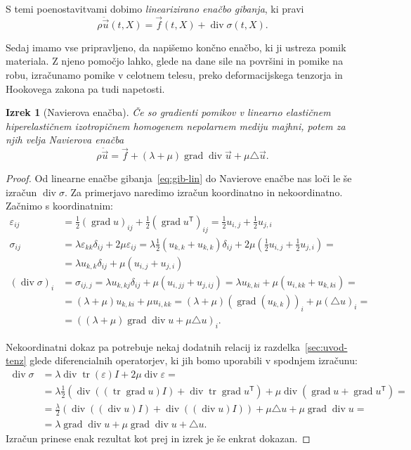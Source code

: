 \documentclass[12pt,a4paper,twoside]{article}
\theoremstyle{definition} %
\theoremstyle{plain} %
\newtheorem{izrek}[definicija]{Izrek}
\numberwithin{equation}{section}
\newcommand{\T}{\mathsf{T}}
\newcommand{\lap}{\triangle}
\renewcommand{\div}{\operatorname{div}}
\newcommand{\grad}{\operatorname{grad}}
\newcommand{\eps}{\varepsilon}
\newcommand{\vu}{\vec{u}}
\newcommand{\vf}{\vec{f}}
\newcommand{\vX}{X}
\newcommand{\ts}{\sigma}
\DeclareMathOperator{\tr}{tr}
\begin{document}
S temi poenostavitvami dobimo \emph{linearizirano enačbo gibanja}, ki pravi
\begin{equation}
  \rho \ddot{\vu}(t, \vX) = \vf(t, \vX) + \div\sigma(t, \vX).
  \label{eq:gib-lin}
\end{equation}

Sedaj imamo vse pripravljeno, da napišemo končno enačbo, ki ji ustreza pomik
materiala. Z njeno pomočjo lahko, glede na dane sile na površini in pomike na
robu, izračunamo pomike v celotnem telesu, preko deformacijskega tenzorja in
Hookovega zakona pa tudi napetosti.
\begin{izrek}[Navierova enačba]
  Če so gradienti pomikov v linearno elastičnem hiperelastičnem
  izotropičnem homogenem nepolarnem mediju majhni, potem za njih velja
  \emph{Navierova enačba}
  \begin{equation}
    \rho \ddot{\vu} = \vf + (\lambda + \mu)\grad\div \vu + \mu \lap \vu.
    \label{eq:navier}
  \end{equation}
\end{izrek}
\begin{proof}
Od linearne enačbe gibanja~\eqref{eq:gib-lin} do Navierove enačbe nas loči le še
izračun $\div \sigma$. Za primerjavo naredimo izračun koordinatno in
nekoordinatno. Začnimo s koordinatnim:
\begin{align*}
  \eps_{ij} &= \frac12 (\grad u)_{ij} + \frac12 (\grad u^\T)_{ij} =
  \frac12 u_{i,j} + \frac12 u_{j,i} \\
  \ts_{ij} &= \lambda \eps_{kk} \delta_{ij} + 2 \mu \eps_{ij} =
  \lambda \frac{1}{2} (u_{k,k} + u_{k,k}) \delta_{ij} + 2 \mu( \frac12 u_{i,j} +
  \frac12 u_{j,i}) =  \\ &= \lambda u_{k, k}\delta_{ij} + \mu (u_{i,j} +u_{j,i})
  \\
  (\div \ts)_i &= \sigma_{ij,j} = \lambda u_{k, kj}\delta_{ij} + \mu (u_{i,jj}
+u_{j,ij}) = \lambda u_{k,ki} + \mu (u_{i,kk} + u_{k,ki}) = \\
&= (\lambda + \mu)u_{k,ki} + \mu u_{i,kk} = (\lambda+\mu)(\grad(u_{k,k}))_i +
\mu (\lap u)_i = \\ &=
((\lambda + \mu)\grad\div u + \mu \lap u)_i.
\end{align*}

Nekoordinatni dokaz pa potrebuje nekaj dodatnih relacij iz
razdelka~\ref{sec:uvod-tenz} glede diferencialnih operatorjev, ki jih bomo
uporabili v spodnjem izračunu:
\begin{align*}
  \div\ts &= \lambda \div \tr(\eps) I + 2\mu \div \eps = \\ &=
  \lambda \frac12(\div((\tr\grad u)I) + \div\tr\grad u^\T) + \mu \div(\grad u + \grad
  u^\T) = \\
  &= \frac{\lambda}{2} (\div((\div u) I) + \div( (\div u)I)) + \mu \lap u + \mu
  \grad \div u = \\
  &= \lambda \grad \div u + \mu \grad \div u + \lap u.
\end{align*}
Izračun prinese enak rezultat kot prej in izrek je še enkrat dokazan.
\end{proof}
\end{document}
